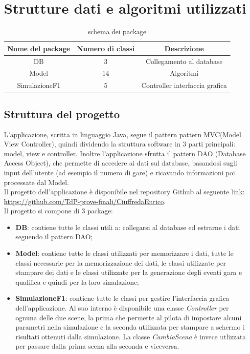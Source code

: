\chapter{Strutture dati e algoritmi utilizzati}
\label{sec:strutture dati e algoritmi utilizzati}

\begin{table}[]
    \centering
    \setcellgapes{3pt}
    \makegapedcells
    \begin{tabular}{|c|c|c|}
    \hline
    \textbf{Nome del package} & \textbf{Numero di classi} & \textbf{Descrizione}\\ \hline
    DB & 3 & Collegamento al database\\ \hline
    Model & 14 & Algoritmi\\ \hline
    SimulazioneF1 & 5 & Controller interfaccia grafica\\ \hline
    \end{tabular}
    \caption{schema dei package}
    \label{tab:schema dei package}
\end{table}
\section[Struttura del progetto]{Struttura del progetto} %
L'applicazione, scritta in linguaggio Java, segue il pattern  pattern MVC(Model View Controller), quindi dividendo la struttura software in 3 parti principali: model, view e controller. Inoltre l'applicazione sfrutta il pattern DAO (Database Access Object), che permette di accedere ai dati sul database, basandosi sugli input dell'utente (ad esempio il numero di gare) e ricavando informazioni poi processate dal Model.\\
Il progetto dell'applicazione è disponibile nel repository Github al seguente link: \href{https://github.com/TdP-prove-finali/CiuffredaEnrico}{https://github.com/TdP-prove-finali/CiuffredaEnrico}.\\
Il progetto si compone di 3 package:
\begin{itemize}

    \item\textbf{ DB}: contiene tutte le classi utili a: collegarsi al database ed estrarne i dati seguendo il pattern DAO;
    \item \textbf{Model}: contiene tutte le classi utilizzati per memorizzare i dati, tutte le classi necessarie per la memorizzazione dei dati, le classi utilizzate per stampare dei dati e le classi utilizzate per la generazione degli eventi gara e qualifica e quindi per la loro simulazione;
    \item \textbf{SimulazioneF1}: contiene tutte le classi per gestire l'interfaccia grafica dell'applicazione. Al suo interno è disponibile una classe \textit{Controller} per ognuna delle due scene, la prima che permette al pilota di impostare alcuni parametri nella simulazione e la seconda utilizzata per stampare a schermo i risultati ottenuti dalla simulazione. La classe \textit{CambiaScena} è invece utlizzata per passare dalla prima scena alla seconda e viceversa.
\end{itemize}
